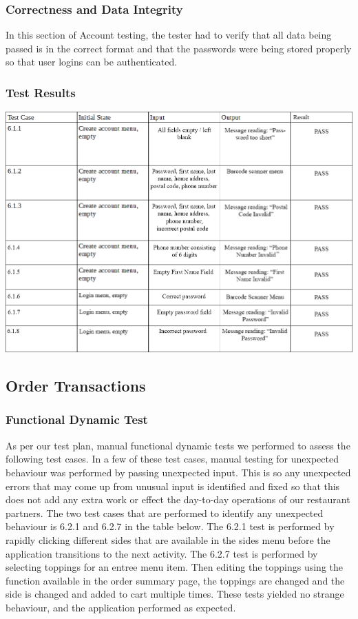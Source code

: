 \documentclass[12pt, titlepage]{article}
\begin{document}
\subsubsection{Correctness and Data Integrity}
In this section of Account testing, the tester had to verify that all data being passed is in the correct format and that the passwords were being stored properly so that user logins can be authenticated. 

\subsubsection{Test Results}
\includegraphics[width=1.2\textwidth]{accountTC.png}

\subsection{Order Transactions}
\subsubsection{Functional Dynamic Test}
As per our test plan, manual functional dynamic tests we performed to assess the following test cases. In a few of these test cases, manual testing for unexpected behaviour was performed by passing unexpected input. This is so any unexpected errors that may come up from unusual input is identified and fixed so that this does not add any extra work or effect the day-to-day operations of our restaurant partners. The two test cases that are performed to identify any unexpected behaviour is 6.2.1 and 6.2.7 in the table below. The 6.2.1 test is performed by rapidly clicking different sides that are available in the sides menu before the application transitions to the next activity. The 6.2.7 test is performed by selecting toppings for an entree menu item. Then editing the toppings using the function available in the order summary page, the toppings are changed and the side is changed and added to cart multiple times. These tests yielded no strange behaviour, and the application performed as expected. 
\end{document}

